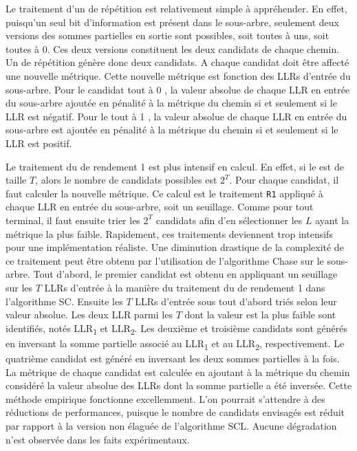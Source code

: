 Le traitement d'un \noeud de répétition est relativement simple à appréhender. En effet, puisqu'un seul bit d'information est présent dans le sous-arbre, seulement deux versions des sommes partielles en sortie sont possibles, soit toutes à uns, soit toutes à 0. Ces deux versions constituent les deux candidats de chaque chemin. Un \noeud de répétition génère donc deux candidats. A chaque candidat doit être affecté une nouvelle métrique. Cette nouvelle métrique est fonction des LLRs d'entrée du sous-arbre. Pour le candidat \og tout à 0 \fg, la valeur absolue de chaque LLR en entrée du sous-arbre ajoutée en pénalité à la métrique du chemin si et seulement si le LLR est négatif. Pour le \noeud \og tout à 1 \fg, la valeur absolue de chaque LLR en entrée du sous-arbre est ajoutée en pénalité à la métrique du chemin si et seulement si le LLR est positif.

Le traitement du \noeud de rendement 1 est plus intensif en calcul. En effet, si le \noeud est de taille $T$, alors le nombre de candidats possibles est $2^T$. Pour chaque candidat, il faut calculer la nouvelle métrique. Ce calcul est le traitement \texttt{R1} appliqué à chaque LLR en entrée du sous-arbre, soit un seuillage. Comme pour tout \noeud terminal, il faut ensuite trier les $2^T$ candidats afin d'en sélectionner les $L$ ayant la métrique la plus faible. Rapidement, ces traitements deviennent trop intensifs pour une implémentation réaliste. Une diminution drastique de la complexité de ce traitement peut être obtenu par l'utilisation de l'algorithme \og Chase \fg sur le sous-arbre. Tout d'abord, le premier candidat est obtenu en appliquant un seuillage sur les $T$ LLRs d'entrée à la manière du traitement du \noeud de rendement 1 dans l'algorithme SC. Ensuite les $T$ LLRs d'entrée sous tout d'abord triés selon leur valeur absolue. Les deux LLR parmi les $T$  dont la valeur est la plus faible sont identifiés, notés LLR\textsubscript{1} et LLR\textsubscript{2}. Les deuxième et troisième candidats sont générés en inversant la somme partielle associé au LLR\textsubscript{1} et au LLR\textsubscript{2}, respectivement. Le quatrième candidat est généré en inversant les deux sommes partielles à la fois. La métrique de chaque candidat est calculée en ajoutant à la métrique du chemin considéré la valeur absolue des LLRs dont la somme partielle a été inversée. Cette méthode empirique fonctionne excellemment. L'on pourrait s'attendre à des réductions de performances, puisque le nombre de candidats envisagés est réduit par rapport à la version non élaguée de l'algorithme SCL. Aucune dégradation n'est observée dans les faits expérimentaux.
 

